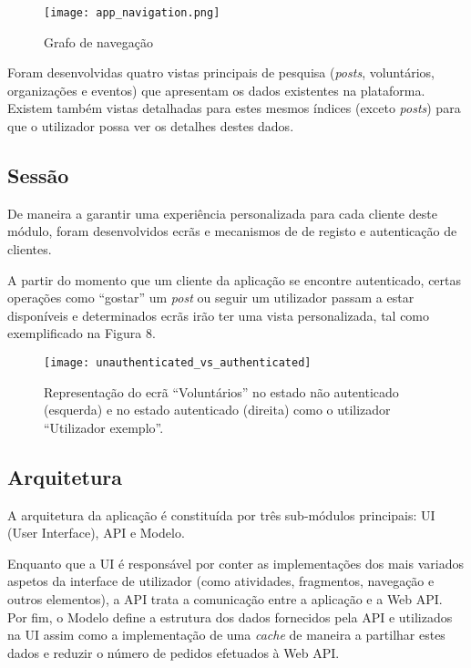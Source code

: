 \newpage

\begin{figure}[h]
	\centering
	\texttt{[image: app\_navigation.png]}
	\caption{Grafo de navegação}
\end{figure}

Foram desenvolvidas quatro vistas principais de pesquisa (\textit{posts}, voluntários, organizações e eventos) que apresentam os dados existentes na plataforma. Existem também vistas detalhadas para estes mesmos índices (exceto \textit{posts}) para que o utilizador possa ver os detalhes destes dados.

\bigskip

\subsection{Sessão}

De maneira a garantir uma experiência personalizada para cada cliente deste módulo, foram desenvolvidos ecrãs e mecanismos de de registo e autenticação de clientes.

\bigskip

A partir do momento que um cliente da aplicação se encontre autenticado, certas operações como ``gostar'' um \textit{post} ou seguir um utilizador passam a estar disponíveis e determinados ecrãs irão ter uma vista personalizada, tal como exemplificado na Figura 8.

\newpage

\begin{figure}[h]
	\centering
	\texttt{[image: unauthenticated\_vs\_authenticated]}
	\caption{Representação do ecrã ``Voluntários'' no estado não autenticado (esquerda) e no estado autenticado (direita) como o utilizador ``Utilizador exemplo''.}
\end{figure}

\subsection{Arquitetura}

A arquitetura da aplicação é constituída por três sub-módulos principais: UI (User Interface), API e Modelo.

\medskip

Enquanto que a UI é responsável por conter as implementações dos mais variados aspetos da interface de utilizador (como atividades, fragmentos, navegação e outros elementos), a API trata a comunicação entre a aplicação e a Web API. Por fim, o Modelo define a estrutura dos dados fornecidos pela API e utilizados na UI assim como a implementação de uma \textit{cache} de maneira a partilhar estes dados e reduzir o número de pedidos efetuados à Web API.

